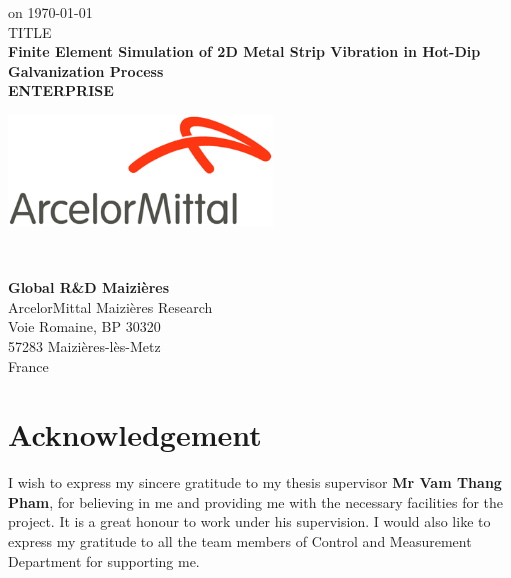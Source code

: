 \documentclass[12pt,twoside]{report}
\begin{document}
\begin{titlepage}
\begin{center}
\vspace{10mm}
on \today %
\\
\vspace{10mm}
TITLE\\
\vspace{5mm}
\textbf{Finite Element Simulation of 2D Metal Strip Vibration in Hot-Dip Galvanization Process}\\

\vspace{10mm}
{\textbf{ENTERPRISE}}


\begin{minipage}{0.45\textwidth}
\begin{flushright}
\includegraphics[width = 70mm]{images/ArcelorMittal_logo.png}
\end{flushright} 
\end{minipage}
~
\begin{minipage}{0.45\textwidth}
\begin{flushleft}
\textbf{Global R\&D Maizières } \\
ArcelorMittal Maizières Research \\
Voie Romaine, BP 30320 \\
57283 Maizières-lès-Metz\\
France
\end{flushleft} 
\end{minipage}
\end{center}
\end{titlepage}

\thispagestyle{empty}
\chapter*{Acknowledgement}
I  wish to express my sincere gratitude to my thesis supervisor \textbf{Mr Vam Thang Pham}, for believing in me and providing me with the necessary facilities for the project. It is a great honour to work under his supervision. I would also like to express my gratitude to all the team members of Control and Measurement Department for supporting me.
\end{document}
